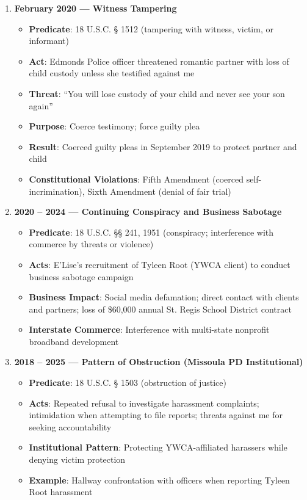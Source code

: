 \documentclass[12pt,letterpaper]{article}
\begin{document}
\begin{enumerate}
\item \textbf{February 2020 --- Witness Tampering}

\begin{itemize}
\item \textbf{Predicate}: 18 U.S.C. § 1512 (tampering with witness, victim, or informant)
\item \textbf{Act}: Edmonds Police officer threatened romantic partner with loss of child custody unless she testified against me
\item \textbf{Threat}: ``You will lose custody of your child and never see your son again''
\item \textbf{Purpose}: Coerce testimony; force guilty plea
\item \textbf{Result}: Coerced guilty pleas in September 2019 to protect partner and child
\item \textbf{Constitutional Violations}: Fifth Amendment (coerced self-incrimination), Sixth Amendment (denial of fair trial)
\end{itemize}

\item \textbf{2020 -- 2024 --- Continuing Conspiracy and Business Sabotage}

\begin{itemize}
\item \textbf{Predicate}: 18 U.S.C. §§ 241, 1951 (conspiracy; interference with commerce by threats or violence)
\item \textbf{Acts}: E'Lise's recruitment of Tyleen Root (YWCA client) to conduct business sabotage campaign
\item \textbf{Business Impact}: Social media defamation; direct contact with clients and partners; loss of \$60,000 annual St. Regis School District contract
\item \textbf{Interstate Commerce}: Interference with multi-state nonprofit broadband development
\end{itemize}

\item \textbf{2018 -- 2025 --- Pattern of Obstruction (Missoula PD Institutional)}

\begin{itemize}
\item \textbf{Predicate}: 18 U.S.C. § 1503 (obstruction of justice)
\item \textbf{Acts}: Repeated refusal to investigate harassment complaints; intimidation when attempting to file reports; threats against me for seeking accountability
\item \textbf{Institutional Pattern}: Protecting YWCA-affiliated harassers while denying victim protection
\item \textbf{Example}: Hallway confrontation with officers when reporting Tyleen Root harassment
\end{itemize}


\end{enumerate}
\end{document}
